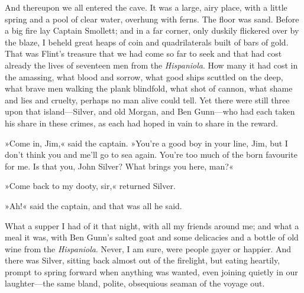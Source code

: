 And thereupon we all entered the cave. It was a large, airy place, with a little spring and a pool of clear water, overhung with ferns. The floor was sand. Before a big fire lay Captain Smollett; and in a far corner, only duskily flickered over by the blaze, I beheld great heaps of coin and quadrilaterals built of bars of gold. That was Flint's treasure that we had come so far to seek and that had cost already the lives of seventeen men from the \textit{Hispaniola}. How many it had cost in the amassing, what blood and sorrow, what good ships scuttled on the deep, what brave men walking the plank blindfold, what shot of cannon, what shame and lies and cruelty, perhaps no man alive could tell. Yet there were still three upon that island—Silver, and old Morgan, and Ben Gunn—who had each taken his share in these crimes, as each had hoped in vain to share in the reward.

»Come in, Jim,« said the captain. »You're a good boy in your line, Jim, but I don't think you and me'll go to sea again. You're too much of the born favourite for me. Is that you, John Silver? What brings you here, man?«

»Come back to my dooty, sir,« returned Silver.

»Ah!« said the captain, and that was all he said.

What a supper I had of it that night, with all my friends around me; and what a meal it was, with Ben Gunn's salted goat and some delicacies and a bottle of old wine from the \textit{Hispaniola}. Never, I am sure, were people gayer or happier. And there was Silver, sitting back almost out of the firelight, but eating heartily, prompt to spring forward when anything was wanted, even joining quietly in our laughter—the same bland, polite, obsequious seaman of the voyage out.